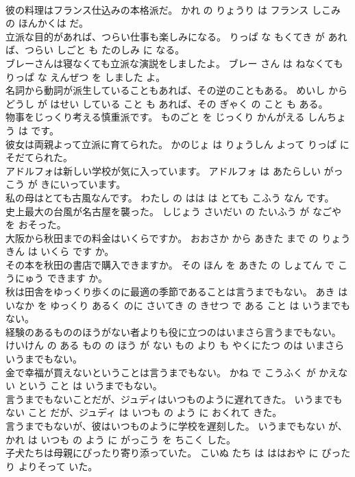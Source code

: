 \documentclass[8pt]{extreport}
\begin{document}
\begin{CJK}{UTF8}{min}
\\	彼の料理はフランス仕込みの本格派だ。	かれ の りょうり は フランス しこみ の ほんかくは だ。	
\\	立派な目的があれば、つらい仕事も楽しみになる。	りっぱ な もくてき が あれば、つらい しごと も たのしみ に なる。	
\\	ブレーさんは寝なくても立派な演説をしましたよ。	ブレー さん は ねなくても りっぱ な えんぜつ を しました よ。	
\\	名詞から動詞が派生していることもあれば、その逆のこともある。	めいし から どうし が はせい している こと も あれば、その ぎゃく の こと も ある。	
\\	物事をじっくり考える慎重派です。	ものごと を じっくり かんがえる しんちょう は です。	
\\	彼女は両親よって立派に育てられた。	かのじょ は りょうしん よって りっぱ に そだてられた。	
\\	アドルフォは新しい学校が気に入っています。	アドルフォ は あたらしい がっこう が きにいっています。	
\\	私の母はとても古風なんです。	わたし の はは は とても こふう なん です。	
\\	史上最大の台風が名古屋を襲った。	しじょう さいだい の たいふう が なごや を おそった。	
\\	大阪から秋田までの料金はいくらですか。	おおさか から あきた まで の りょうきん は いくら です か。	
\\	その本を秋田の書店で購入できますか。	その ほん を あきた の しょてん で こうにゅう できます か。	
\\	秋は田舎をゆっくり歩くのに最適の季節であることは言うまでもない。	あき は いなか を ゆっくり あるく のに さいてき の きせつ で ある こと は いうまでもない。	
\\	経験のあるもののほうがない者よりも役に立つのはいまさら言うまでもない。	けいけん の ある もの の ほう が ない もの より も やくにたつ のは いまさら いうまでもない。	
\\	金で幸福が買えないということは言うまでもない。	かね で こうふく が かえない という こと は いうまでもない。	
\\	言うまでもないことだが、ジュディはいつものように遅れてきた。	いうまでもない こと だが、ジュディ は いつも の よう に おくれて きた。	
\\	言うまでもないが、彼はいつものように学校を遅刻した。	いうまでもない が、かれ は いつも の よう に がっこう を ちこく した。	
\\	子犬たちは母親にぴったり寄り添っていた。	こいぬ たち は ははおや に ぴったり よりそって いた。	

\end{CJK}
\end{document}
